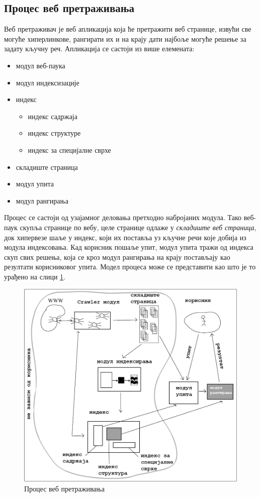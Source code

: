 \subsection{Процес веб претраживања}\label{subsec:web}

Веб претраживач је веб апликација која ће претражити веб странице, извући све могуће хиперлинкове, рангирати их и на крају дати најбоље могуће решење за задату кључну реч. Апликација се састоји из више елемената:
\begin{itemize}
\item модул веб-паука
\item модул индексизације
\item индекс
      \begin{itemize}
      \item индекс садржаја
      \item индекс структуре
      \item индекс за специјалне сврхе
      \end{itemize}
\item складиште страница
\item модул упита
\item модул рангирања

\end{itemize}

Процес се састоји од узајамног деловања претходно набројаних модула. Тако веб-паук скупља странице по вебу, целе странице одлаже у \emph{складиште веб страница}, док хипервезе шаље у индекс, који их поставља уз кључне речи које добија из модула индексовања. Кад корисник пошаље упит, модул упита тражи од индекса скуп свих решења, која се кроз модул рангирања на крају постављају као резултати корисниковог упита. Модел процеса може се представити као што је то урађено на слици  \ref{slike:crawling}.
\begin{figure}
\centering
\includegraphics[scale=0.5]{crawling.png}
\caption{Процес веб претраживања \cite[Ch 1.3.2]{langville2011google}}
\label{slike:crawling}
\end{figure}

